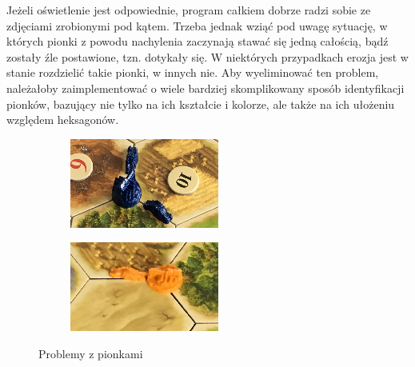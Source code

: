 \documentclass[a4paper]{article}
\begin{document}
    Jeżeli oświetlenie jest odpowiednie, program całkiem dobrze radzi sobie ze zdjęciami zrobionymi pod kątem. Trzeba jednak wziąć pod uwagę sytuację, w których pionki z powodu nachylenia zaczynają stawać się jedną całością, bądź zostały źle postawione, tzn. dotykały się. W niektórych przypadkach erozja jest w stanie rozdzielić takie pionki, w innych nie. Aby wyeliminować ten problem, należałoby zaimplementować o wiele bardziej skomplikowany sposób identyfikacji pionków, bazujący nie tylko na ich kształcie i kolorze, ale także na ich ułożeniu względem heksagonów.
		\begin{figure}[H]
        \begin{subfigure}[]{0.5\linewidth}
        \includegraphics[width=\linewidth]{pictures/fields/angle.png}
        \end{subfigure}
        \begin{subfigure}[]{0.5\linewidth}
        \includegraphics[width=\linewidth]{pictures/fields/touch.png}
        \end{subfigure}

        \caption{Problemy z pionkami}
        \label{fig:step6}
    \end{figure}
\end{document}
